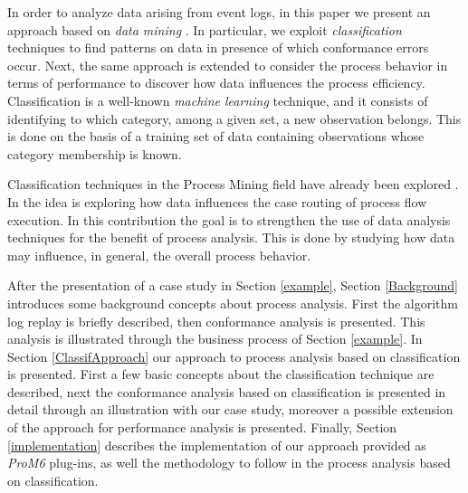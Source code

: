 \documentclass{llncs}
\begin{document}
In order to analyze data arising from event logs, in this paper we present an approach based on \emph{data mining} \cite{5}. In particular, we exploit \emph{classification} techniques to find patterns on data in presence of which conformance errors occur. Next, the same approach is extended to consider the process behavior in terms of performance to discover how data influences the process efficiency. Classification is a well-known \emph{machine learning} technique, and it consists of identifying to which category, among a given set, a new observation belongs. This is done on the basis of a training set of data containing observations whose category membership is known.

Classification techniques in the Process Mining field have already been explored \cite{1}\cite{14}. In \cite{1} the idea is exploring how data influences the case routing of process flow execution. In this contribution the goal is to strengthen the use of data analysis techniques for the benefit of process analysis. This is done by studying how data may influence, in general, the overall process behavior.

After the presentation of a case study in Section \ref{example}, Section \ref{Background} introduces some background concepts about process analysis. First the algorithm log replay is briefly described, then conformance  analysis is presented. This analysis is illustrated through the business process of Section \ref{example}. In Section \ref{ClassifApproach} our approach to process analysis based on classification is presented. First a few basic concepts about the classification technique are described, next the conformance analysis based on classification is presented in detail through an illustration with our case study, moreover a possible extension of the approach for performance analysis is presented. Finally, Section \ref{implementation} describes the implementation of our approach provided as \emph{ProM6}\cite{6} plug-ins, as well the methodology to follow in the process analysis based on classification.
\end{document}
